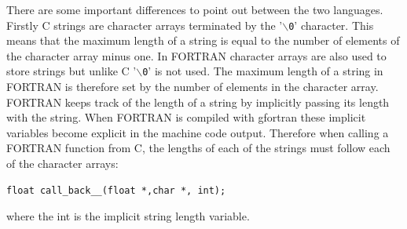 \documentclass[11pt]{scrartcl}
\begin{document}
There are some important differences to point out between the two
languages.  Firstly C strings are character arrays terminated by the
'\texttt{$\backslash$0}' character.  This means that the maximum
length of a string is equal to the number of elements of the character
array minus one.  In FORTRAN character arrays are also used to store
strings but unlike C '\texttt{$\backslash$0}' is not used.  The
maximum length of a string in FORTRAN is therefore set by the number
of elements in the character array.  FORTRAN keeps track of the length
of a string by implicitly passing its length with the string.  When
FORTRAN is compiled with gfortran these implicit variables become explicit
in the machine code output.  Therefore when calling a FORTRAN function
from C, the lengths of each of the strings must follow each of the
character arrays:
\begin{lstlisting}
float call_back__(float *,char *, int);
\end{lstlisting}
where the int is the implicit string length variable.
\end{document}

